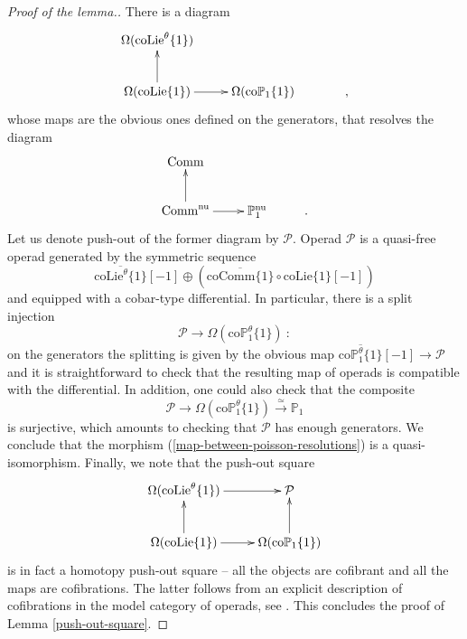 \documentclass[10pt, oneside]{amsart}
\theoremstyle{plain}
\newcommand{\comm}{\mathrm{Comm}}
\newcommand{\ccomm}{\mathrm{coComm}}
\newcommand{\colie}{\mathrm{coLie}}
\newcommand{\ccolie}{\mathrm{coLie}^\theta}
\renewcommand{\P}{\mathcal{P}}
\newcommand{\PP}{\mathbb{P}}
\newcommand{\coP}{\mathrm{co}\PP}
\newcommand{\ccoP}{\mathrm{co}\PP^\theta}
\begin{document}
\begin{proof}[Proof of the lemma.]

There is a diagram
\[\xymatrix{
\Omega(\ccolie\{1\}) && \\
\Omega(\colie\{1\}) \ar[r]\ar[u] & \Omega(\coP_1\{1\}) & \quad,
}\]
whose maps are the obvious ones defined on the generators,
that resolves the diagram
\[\xymatrix{
\comm && \\
\comm^{\text{nu}} \ar[r]\ar[u] & \PP^{\text{nu}}_1 & .
}\]
Let us denote push-out of the former diagram by $\P$. Operad $\P$ is a quasi-free operad generated by the symmetric sequence
\begin{equation*}
\overline{\ccolie\{1\}}[-1] \oplus ( \overline{\ccomm\{1\}} \circ \colie\{1\}[-1] )
\end{equation*}
and equipped with a cobar-type differential. In particular, there is a split injection
\begin{equation}\label{map-between-poisson-resolutions}
\P \longrightarrow \Omega(\ccoP_1\{1\}) \: :
\end{equation}
on the generators the splitting is given by the obvious map
$\overline{\ccoP_1\{1\}}[-1] \longrightarrow \P$ and it is straightforward to check that the resulting map of operads is compatible 
with the differential. In addition, one could also check that the composite
\begin{equation*}
\P \longrightarrow \Omega(\ccoP_1\{1\}) \stackrel{\simeq}{\longrightarrow} \PP_1
\end{equation*}
is surjective, which amounts to checking that $\P$ has enough generators. We conclude that the morphism
(\ref{map-between-poisson-resolutions}) is a quasi-isomorphism. Finally, we note that
the push-out square
\[\xymatrix{
\Omega(\ccolie\{1\}) \ar[r] & \P \\
\Omega(\colie\{1\}) \ar[r]\ar[u] & \Omega(\coP_1\{1\}) \ar[u]
}\]
is in fact a homotopy push-out square -- all the objects are cofibrant and all the maps are cofibrations. The latter follows from
an explicit description of cofibrations in the model category of operads, see \cite{Hinich}.
This concludes the proof of Lemma
\ref{push-out-square}.
\end{proof}
\end{document}
